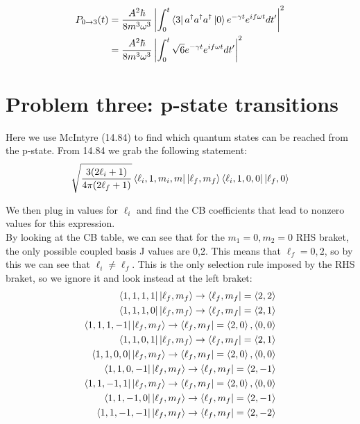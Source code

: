 \documentclass[10pt]{article} %
\begin{document}
\begin{align*}
  P_{0\rightarrow 3}(t) &= \frac{A^2\hbar}{8m^3\omega^3}
  \left|\int_0^t\bra{3}a^\dagger a^\dagger a^\dagger\ket{0}e^{-\gamma t}e^{if\omega t}dt'\right|^2\\
  &= \frac{A^2\hbar}{8m^3\omega^3}\left|\int_0^t\sqrt{6}e^{-\gamma t}e^{if\omega t}dt'\right|^2\\
\end{align*}

\section{Problem three: p-state transitions}
Here we use McIntyre (14.84) to find which quantum states can be reached from the p-state.
From 14.84 we grab the following statement:\\

\begin{align*}
  \sqrt{\frac{3(2\ell_i+1)}{4\pi(2\ell_f+1)}}\bra{\ell_i,1,m_i,m}\ket{\ell_f,m_f}
  \bra{\ell_i,1,0,0}\ket{\ell_f,0}\\
\end{align*}

We then plug in values for $\ell_i$ and find the CB coefficients that lead to nonzero
values for this expression.\\

By looking at the CB table, we can see that for the $m_1=0,m_2=0$ RHS braket, the only
possible coupled basis J values are 0,2. This means that $\ell_f=0,2$, so by this we
can see that $\ell_i\neq\ell_f$. This is the only selection rule imposed by the RHS
braket, so we ignore it and look instead at the left braket:\\

\begin{align*}
  \bra{1,1,1,1}\ket{\ell_f,m_f}  \rightarrow\bra{\ell_f,m_f}=\braket{2,2}\\
  \bra{1,1,1,0}\ket{\ell_f,m_f}  \rightarrow\bra{\ell_f,m_f}=\braket{2,1}\\
  \bra{1,1,1,-1}\ket{\ell_f,m_f} \rightarrow\bra{\ell_f,m_f}=\braket{2,0},\braket{0,0}\\
  \bra{1,1,0,1}\ket{\ell_f,m_f}  \rightarrow\bra{\ell_f,m_f}=\braket{2,1}\\
  \bra{1,1,0,0}\ket{\ell_f,m_f}  \rightarrow\bra{\ell_f,m_f}=\braket{2,0},\braket{0,0}\\
  \bra{1,1,0,-1}\ket{\ell_f,m_f} \rightarrow\bra{\ell_f,m_f}=\braket{2,-1}\\
  \bra{1,1,-1,1}\ket{\ell_f,m_f} \rightarrow\bra{\ell_f,m_f}=\braket{2,0},\braket{0,0}\\
  \bra{1,1,-1,0}\ket{\ell_f,m_f} \rightarrow\bra{\ell_f,m_f}=\braket{2,-1}\\
  \bra{1,1,-1,-1}\ket{\ell_f,m_f}\rightarrow\bra{\ell_f,m_f}=\braket{2,-2}\\
\end{align*}
\end{document}
